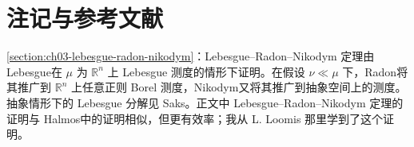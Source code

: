 \documentclass[../../main.tex]{subfiles}%
\begin{document}
\section{注记与参考文献}\label{section:ch03-notes-references}
\cref{section:ch03-lebesgue-radon-nikodym}：Lebesgue–Radon–Nikodym 定理由 Lebesgue\cite{folland-bib-092}在 $\mu$ 为 $\mathbb R^n$ 上 Lebesgue 测度的情形下证明。在假设 $\nu\ll\mu$ 下，Radon\cite{folland-bib-111}将其推广到 $\mathbb R^n$ 上任意正则 Borel 测度，Nikodym\cite{folland-bib-107}又将其推广到抽象空间上的测度。抽象情形下的 Lebesgue 分解见 Saks\cite{folland-bib-128}。正文中 Lebesgue–Radon–Nikodym 定理的证明与 Halmos\cite{folland-bib-061}中的证明相似，但更有效率；我从 L. Loomis 那里学到了这个证明。
\end{document}
